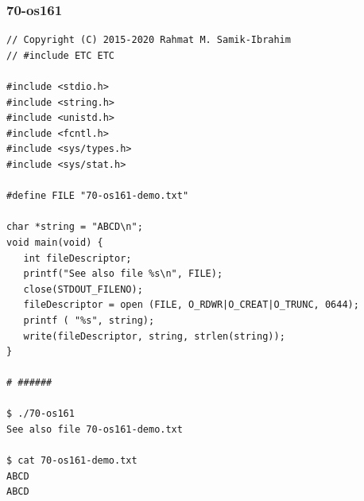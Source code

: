 \documentclass[xcolor=table, notheorems, hyperref={pdfpagelabels=false}]{beamer}
\begin{document}
\begin{frame}[fragile]
\frametitle{70-os161}
\begin{lstlisting}[basicstyle=\ttfamily\tiny]
// Copyright (C) 2015-2020 Rahmat M. Samik-Ibrahim
// #include ETC ETC

#include <stdio.h>
#include <string.h>
#include <unistd.h>
#include <fcntl.h>
#include <sys/types.h>
#include <sys/stat.h>

#define FILE "70-os161-demo.txt"

char *string = "ABCD\n";
void main(void) {
   int fileDescriptor;
   printf("See also file %s\n", FILE);
   close(STDOUT_FILENO);
   fileDescriptor = open (FILE, O_RDWR|O_CREAT|O_TRUNC, 0644);
   printf ( "%s", string);
   write(fileDescriptor, string, strlen(string));
}

# ######

$ ./70-os161 
See also file 70-os161-demo.txt

$ cat 70-os161-demo.txt 
ABCD
ABCD

\end{lstlisting}
\end{frame}

\end{document}
